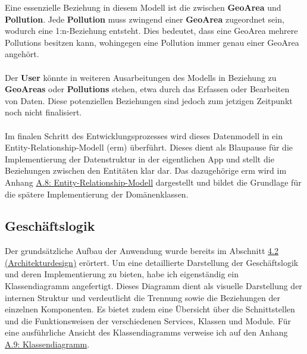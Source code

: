 \documentclass[a4paper,12pt]{article}
\begin{document}
Eine essenzielle Beziehung in diesem Modell ist die zwischen \textbf{GeoArea} und \textbf{Pollution}. Jede \textbf{Pollution} muss zwingend einer \textbf{GeoArea} zugeordnet sein, wodurch eine 1:n-Beziehung entsteht. Dies bedeutet, dass eine GeoArea mehrere Pollutions besitzen kann, wohingegen eine Pollution immer genau einer GeoArea angehört.\\
\\
Der \textbf{User} könnte in weiteren Ausarbeitungen des Modells in Beziehung zu \textbf{GeoAreas} oder \textbf{Pollutions} stehen, etwa durch das Erfassen oder Bearbeiten von Daten. Diese potenziellen Beziehungen sind jedoch zum jetzigen Zeitpunkt noch nicht finalisiert.\\
\\
Im finalen Schritt des Entwicklungsprozesses wird dieses Datenmodell in ein Entity-Relationship-Modell (\acrshort{erm}) überführt. Dieses dient als Blaupause für die Implementierung der Datenstruktur in der eigentlichen App und stellt die Beziehungen zwischen den Entitäten klar dar. Das dazugehörige \acrshort{erm} wird im Anhang \hyperref[sec:entity-relationship-modell]{A.8: Entity-Relationship-Modell} dargestellt und bildet die Grundlage für die spätere Implementierung der Domänenklassen.

\subsection{Geschäftslogik}
Der grundsätzliche Aufbau der Anwendung wurde bereits im Abschnitt \hyperref[sec:architekturdesign]{4.2 (Architekturdesign)} erörtert. Um eine detaillierte Darstellung der Geschäftslogik und deren Implementierung zu bieten, habe ich eigenständig ein Klassendiagramm angefertigt. Dieses Diagramm dient als visuelle Darstellung der internen Struktur und verdeutlicht die Trennung sowie die Beziehungen der einzelnen Komponenten. Es bietet zudem eine Übersicht über die Schnittstellen und die Funktionsweisen der verschiedenen Services, Klassen und Module. Für eine ausführliche Ansicht des Klassendiagramms verweise ich auf den Anhang \hyperref[sec:klassendiagramm]{A.9: Klassendiagramm}.
\end{document}
